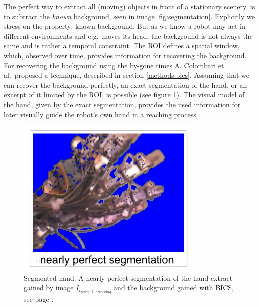 The perfect way to extract all (moving) objects in front of a stationary scenery, is to subtract the \textit{known} background, seen in image \ref{fig:segmentation}. Explicitly we stress on the property: known background. But as we know a robot may act in different environments and e.g.\ moves its head, the background is not always the same and is rather a temporal constraint. The ROI defines a spatial window, which, observed over time, provides information for recovering the background. For recovering the background using the by-gone times A. Colombari et al.\ proposed a technique, described in section \ref{methods:bics}. Assuming that we can recover the background perfectly, an exact segmentation of the hand, or an excerpt of it limited by the ROI, is possible (see figure \ref{fig:perfsegm}). The visual model of the hand, given by the exact segmentation, provides the used information for later visually guide the robot's own hand in a reaching process.
%
\begin{figure}[h]
	\begin{center}
		\includegraphics[width=3.5in]{imgs/method/perfsegm.ps}
	\end{center}
		\caption[Segmented hand. ]{Segmented hand. A nearly perfect segmentation of the hand extract gained by image $I_{t_{ready}+\tau_{tracking}}$ and the background gained with BICS, see page \pageref{methods:bics}.}
		\label{fig:perfsegm}
\end{figure}
%
